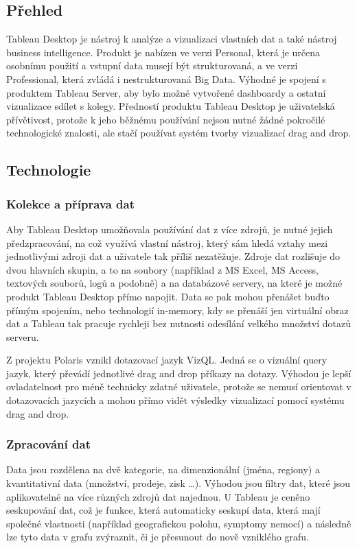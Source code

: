 \documentclass[czech,BP]{thesiskiv}
\begin{document}
 \subsection{Přehled}
 Tableau Desktop je nástroj k analýze a vizualizaci vlastních dat a také nástroj business intelligence. Produkt je nabízen ve verzi Personal, která je určena osobnímu použití a vstupní data musejí být strukturovaná, a ve verzi Professional, která zvládá i nestrukturovaná Big Data. Výhodné je spojení s produktem Tableau Server, aby bylo možné vytvořené dashboardy a ostatní vizualizace sdílet s kolegy. Předností produktu Tableau Desktop je uživatelská přívětivost, protože k jeho běžnému používání nejsou nutné žádné pokročilé technologické znalosti, ale stačí používat systém tvorby vizualizací drag and drop. 
 
 \subsection{Technologie}
 \subsubsection{Kolekce a příprava dat}
 Aby Tableau Desktop umožňovala používání dat z více zdrojů, je nutné jejich předzpracování, na což využívá vlastní nástroj, který sám hledá vztahy mezi jednotlivými zdroji dat a uživatele tak příliš nezatěžuje. Zdroje dat rozlišuje do dvou hlavních skupin, a to na soubory (například z MS Excel, MS Access, textových souborů, logů a podobně) a na databázové servery, na které je možné produkt Tableau Desktop přímo napojit. Data se pak mohou přenášet buďto přímým spojením, nebo technologií in-memory, kdy se přenáší jen virtuální obraz dat a Tableau tak pracuje rychleji bez nutnosti odesílání velkého množství dotazů serveru.


 Z projektu Polaris vznikl dotazovací jazyk VizQL\texttrademark. Jedná se o vizuální query jazyk, který převádí jednotlivé drag and drop příkazy na dotazy.\cite{VizQL} Výhodou je lepší ovladatelnost pro méně technicky zdatné uživatele, protože se nemusí orientovat v dotazovacích jazycích a mohou přímo vidět výsledky vizualizací pomocí systému drag and drop.
 
 \subsubsection{Zpracování dat}
 Data jsou rozdělena na dvě kategorie, na dimenzionální (jména, regiony) a kvantitativní data (množství, prodeje, zisk …). Výhodou jsou filtry dat, které jsou aplikovatelné na více různých zdrojů dat najednou. U Tableau je ceněno seskupování dat, což je funkce, která automaticky seskupí data, která mají společné vlastnosti (například geografickou polohu, symptomy nemocí) a následně lze tyto data v grafu zvýraznit, či je přesunout do nově vzniklého grafu.\cite{TableauDimensions}
  
\end{document}
